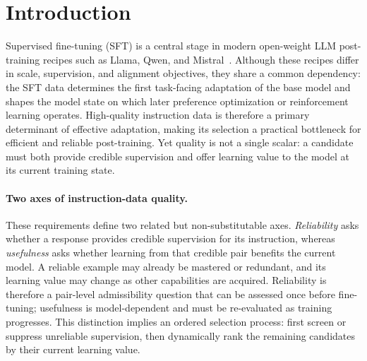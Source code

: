 \section{Introduction}
\label{sec:intro}
Supervised fine-tuning (SFT) is a central stage in modern open-weight
LLM post-training recipes such as Llama, Qwen, and
Mistral~\cite{dubey2024llama3,qwen2025technical,jiang2023mistral}.
Although these recipes differ in scale, supervision, and alignment
objectives, they share a common dependency: the SFT data determines
the first task-facing adaptation of the base model and shapes the
model state on which later preference optimization or reinforcement
learning operates. High-quality instruction data is therefore a
primary determinant of effective adaptation, making its selection a
practical bottleneck for efficient and reliable post-training. Yet
quality is not a single scalar: a candidate must both provide
credible supervision and offer learning value to the model at its
current training state.

\paragraph{Two axes of instruction-data quality.}
These requirements define two related but non-substitutable axes.
\emph{Reliability} asks whether a response provides credible
supervision for its instruction, whereas \emph{usefulness} asks
whether learning from that credible pair benefits the current model.
A reliable example may already be mastered or redundant, and its
learning value may change as other capabilities are acquired.
Reliability is therefore a pair-level admissibility question that can
be assessed once before fine-tuning; usefulness is model-dependent
and must be re-evaluated as training progresses. This distinction
implies an ordered selection process: first screen or suppress
unreliable supervision, then dynamically rank the remaining
candidates by their current learning value.


